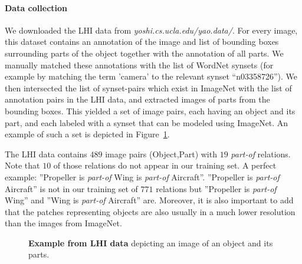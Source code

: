 \paragraph{Data collection}
We downloaded the LHI data from {\em yoshi.cs.ucla.edu/yao.data/}. For
every image, this dataset contains an annotation of the image and list
of bounding boxes surrounding parts of the object together with the
annotation of all parts. We manually matched these annotations with
the list of WordNet synsets (for example by matching the term 'camera'
to the relevant synset ``n03358726''). We then intersected the list of
synset-pairs which exist in ImageNet with the list of annotation pairs
in the LHI data, and extracted images of parts from the bounding
boxes. This yielded a set of image pairs, each having an object and
its part, and each labeled with a synset that can be modeled using
ImageNet. An example of such a set is depicted in Figure~\ref{fig:labelme}.


The LHI data contains $489$ image pairs (Object,Part) with $19$ \textit{part-of}
relations. Note that $10$ of those relations do not appear in our training set.
A perfect example: ''Propeller is \textit{part-of} Wing is \textit{part-of} Aircraft''.
''Propeller is \textit{part-of} Aircraft'' is not in our training set of $771$
relations but ''Propeller is \textit{part-of} Wing'' and ''Wing is
\textit{part-of} Aircraft'' are.
%
Moreover, it is also important to add that the patches representing
objects are also usually in a much lower resolution than the images from
ImageNet.

\begin{figure}[t!]
  \begin{center}
    \caption{{\bf Example from LHI data} depicting an image of an object and its parts.}
    \label{fig:labelme}
    \end{center}
\end{figure}



